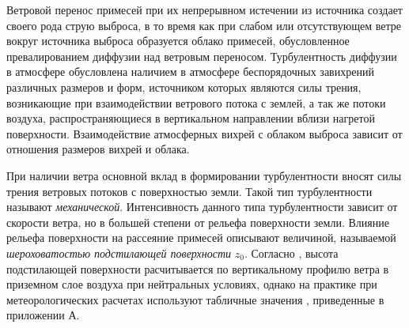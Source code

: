 Ветровой перенос примесей при их непрерывном истечении из источника создает своего рода струю выброса, в то время как 
при слабом или отсутствующем ветре вокруг источника выброса образуется облако примесей, обусловленное превалированием 
диффузии над ветровым переносом. Турбулентность диффузии в атмосфере обусловлена наличием в атмосфере беспорядочных 
завихрений различных размеров и форм, источником которых являются силы трения, возникающие при взаимодействии ветрового 
потока с землей, а так же потоки воздуха, распространяющиеся в вертикальном направлении вблизи нагретой поверхности. 
Взаимодействие атмосферных вихрей с облаком выброса зависит от отношения размеров вихрей и облака. \cite{gusev_bio}

При наличии ветра основной вклад в формировании турбулентности вносят силы трения ветровых потоков с поверхностью земли. 
Такой тип турбулентности называют \textit{механической}. Интенсивность данного типа турбулентности зависит от скорости 
ветра, но в большей степени от рельефа поверхности земли. Влияние рельефа поверхности на рассеяние примесей описывают 
величиной, называемой \textit{шероховатостью подстилающей поверхности} $z_0$. Согласно \cite{setton, bizova, berlyand}, 
высота подстилающей поверхности расчитывается по вертикальному профилю ветра в приземном слое воздуха при нейтральных 
условиях, однако на практике при метеорологических расчетах используют табличные значения \cite{mlyavaya}, приведенные 
в приложении А.




